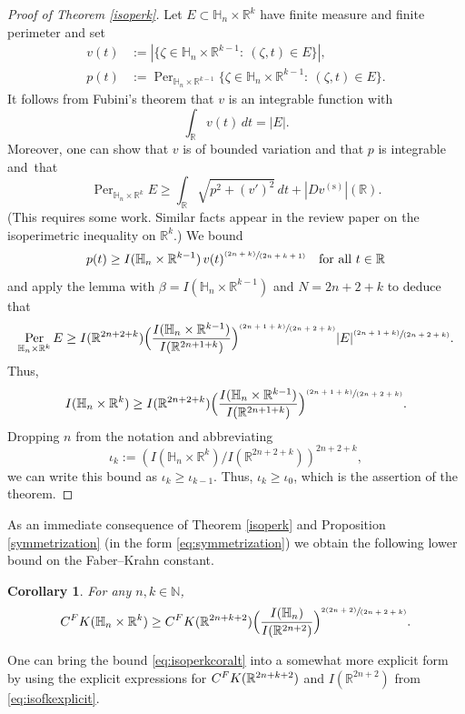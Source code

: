 \documentclass[11pt]{article}
\let\oldsfrac\sfrac
\renewcommand{\sfrac}[2]{{\oldsfrac{#1}{#2}}}
\newcommand{\spfrac}[2]{{\sfrac{#1}{(#2)}}}
\newcommand{\pspfrac}[2]{{\sfrac{(#1)}{(#2)}}}
\newcommand{\FK}{\textup{FK}}
\newtheorem{corollary}[theorem]{Corollary}
\theoremstyle{definition}
\newcommand{\1}{\mathbbm{1}}
\newcommand{\N}{\mathbb{N}}
\newcommand{\R}{\mathbb{R}}
\DeclareMathOperator{\per}{Per}
\numberwithin{equation}{section}
\begin{document}
\begin{proof}[Proof of Theorem \ref{isoperk}]
Let $E\subset\mathbb H_n\times\R^k$ have finite measure and finite perimeter and set
\begin{align*}
v(t) & := |\{ \zeta\in\mathbb H_n\times\R^{k-1} :\ (\zeta,t)\in E\}|, \\
p(t) & := \per_{\mathbb H_n\times\R^{k-1}} \{ \zeta\in\mathbb H_n\times\R^{k-1} :\ (\zeta,t)\in E\}.
\end{align*}
It follows from Fubini's theorem that $v$ is an integrable function with
\[
\int_\R v(t)\,dt = |E|.
\]
Moreover, one can show that $v$ is of bounded variation and that $p$ is integrable and~that
\[
\per_{\mathbb H_n\times\R^k} E \geq \int_\R \sqrt{ p^2 + (v')^2}\,dt + |Dv^{(\mathrm{s})}|(\R).
\]
(This requires some work. Similar facts appear in the review paper \cite{Ta} on the isoperimetric inequality on $\R^k$.) We bound
\[
p(t) \geq I(\mathbb H_n\times\R^{k-1})\,v(t)^\pspfrac{2n+k}{2n+k+1}
\quad\text{for all}\ t\in\R
\]
and apply the lemma with $\beta = I(\mathbb H_n\times\R^{k-1})$ and $N=2n+2+k$ to deduce that
\[
\per_{\mathbb H_n\times\R^k} E \geq
I(\R^{2n+2+k}) \Bigl(\frac{I(\mathbb H_n\times\R^{k-1})}{I(\R^{2n+1+k})}\Bigr)^\pspfrac{2n+1+k}{2n+2+k} |E|^\pspfrac{2n+1+k}{2n+2+k}.
\]
Thus,
\[
I(\mathbb H_n\times\R^k) \geq
I(\R^{2n+2+k}) \Bigl(\frac{I(\mathbb H_n\times\R^{k-1})}{I(\R^{2n+1+k})} \Bigr)^\pspfrac{2n+1+k}{2n+2+k}.
\]
Dropping $n$ from the notation and abbreviating
\[
\iota_k:= \left(I(\mathbb H_n\times\R^k)/I(\R^{2n+2+k})\right)^{2n+2+k},
\]
we can write this bound as $\iota_k\geq\iota_{k-1}$. Thus, $\iota_k\geq\iota_0$, which is the assertion of the theorem.
\end{proof}

As an immediate consequence of Theorem \ref{isoperk} and Proposition \ref{symmetrization} (in the form \eqref{eq:symmetrization}) we obtain the following lower bound on the Faber--Krahn constant.

\begin{corollary}\label{isoperkcor}
For any $n,k\in\N$,
\begin{equation}
\label{eq:isoperkcoralt}
C^\FK(\mathbb H_n\times\R^k) \geq C^\FK(\R^{2n+k+2}) \Bigl(\frac{I(\mathbb H_n)}{I(\R^{2n+2})} \Bigr)^\spfrac{2(2n+2)}{2n+2+k}.
\end{equation}
\end{corollary}

One can bring the bound \eqref{eq:isoperkcoralt} into a somewhat more explicit form by using the explicit expressions for $C^\FK(\R^{2n+k+2})$ and $I(\R^{2n+2})$ from \eqref{eq:isofkexplicit}.
\end{document}
